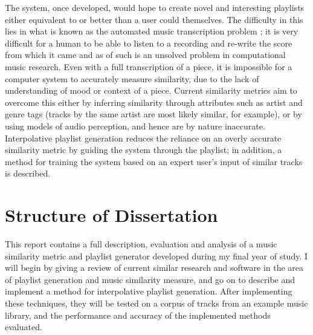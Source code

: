The system, once developed, would hope to create novel and interesting playlists either equivalent to or better than a user could themselves. The difficulty in this lies in what is known as the automated music transcription problem \citep{Hainsworth2004}; it is very difficult for a human to be able to listen to a recording and re-write the score from which it came and as of such is an unsolved problem in computational music research. Even with a full transcription of a piece, it is impossible for a computer system to accurately measure similarity, due to the lack of understanding of mood or context of a piece. Current similarity metrics aim to overcome this either by inferring similarity through attributes such as artist and genre tags (tracks by the same artist are most likely similar, for example), or by using models of audio perception, and hence are by nature inaccurate. Interpolative playlist generation reduces the reliance on an overly accurate similarity metric by guiding the system through the playlist; in addition, a method for training the system based on an expert user's input of similar tracks is described.
\section{Structure of Dissertation}
This report contains a full description, evaluation and analysis of a music similarity metric and playlist generator developed during my final year of study. I will begin by giving a review of current similar research and software in the area of playlist generation and music similarity measure, and go on to describe and implement a method for interpolative playlist generation. After implementing these techniques, they will be tested on a corpus of tracks from an example music library, and the performance and accuracy of the implemented methods evaluated.
